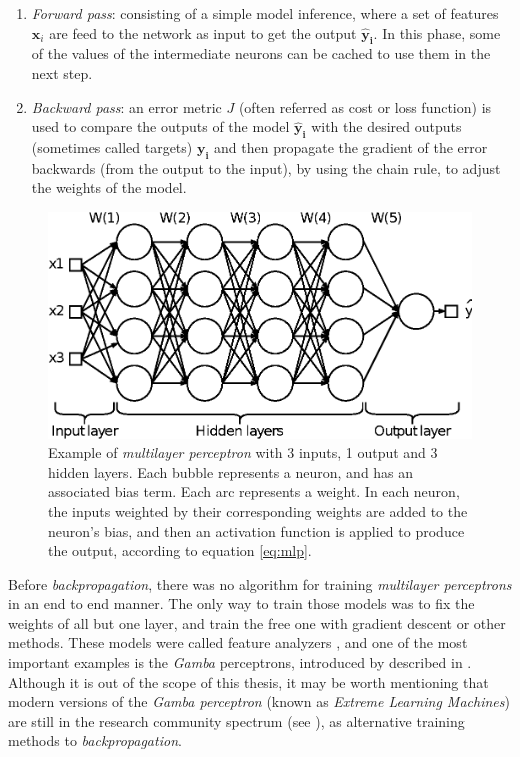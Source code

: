 \begin{enumerate}
\item \textit{Forward pass}: consisting of a simple model inference, where a set of features $\mathbf{x}_i$ are feed to the network as input to get the output $\mathbf{\hat{y}_i}$. In this phase, some of the values of the intermediate neurons can be cached to use them in the next step.

\item \textit{Backward pass}: an error metric $J$ (often referred as cost or loss function) is used to compare the outputs of the model $\mathbf{\hat{y}_i}$ with the desired outputs (sometimes called targets) $\mathbf{y_i}$ and then propagate the gradient of the error backwards (from the output to the input), by using the chain rule, to adjust the weights of the model.
\end{enumerate}


\begin{figure}
	\centering
	\includegraphics[width=0.8\linewidth]{chapter2/images/mlp}
	\caption{Example of \textit{multilayer perceptron} with 3 inputs, 1 output and 3 hidden layers. Each bubble represents a neuron, and has an associated bias term. Each arc represents a weight. In each neuron, the inputs weighted by their corresponding weights are added to the neuron's bias, and then an activation function is applied to produce the output, according to equation \ref{eq:mlp}.}
	\label{fig:mlp}
\end{figure}


Before \textit{backpropagation}, there was no algorithm for training \textit{multilayer perceptrons} in an end to end manner. The only way to train those models was to fix the weights of all but one layer, and train the free one with gradient descent or other methods. These models were called feature analyzers \autocite{hinton1986}, and one of the most important examples is the \textit{Gamba} perceptrons, introduced by described in \autocite{minsky69}. Although it is out of the scope of this thesis, it may be worth mentioning that modern versions of the \textit{Gamba perceptron} (known as \textit{Extreme Learning Machines}) are still in the research community spectrum (see \autocite{Huang2006, Huang2012}), as alternative training methods to \textit{backpropagation}.

